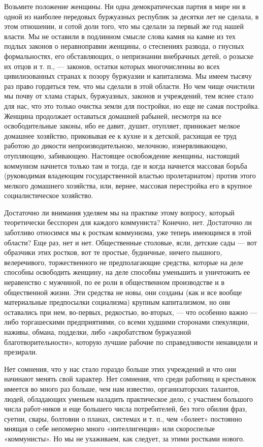 \documentclass[12pt]{article}
\newcommand{\parnum}{(\arabic{parcount})}
\newcounter{parcount}
\newenvironment{parnumbers}{%
  \par%
  \everypar{\noindent \stepcounter{parcount}\marginpar[]{\parnum}}%
}{}
\begin{document}
\begin{parnumbers}
Возьмите положение женщины. Ни одна демократическая партия в мире ни в одной из наиболее передовых буржуазных республик за десятки лет не сделала, в этом отношении, и сотой доли того, что мы сделали за первый же год нашей власти. Мы не оставили в подлинном смысле слова камня на камне из тех подлых законов о неравноправии женщины, о стеснениях развода, о гнусных формальностях, его обставляющих, о непризнании внебрачных детей, о розыске их отцов и т. п., — законов, остатки которых многочисленны во всех цивилизованных странах к позору буржуазии и капитализма. Мы имеем тысячу раз право гордиться тем, что мы сделали в этой области. Но чем чище очистили мы почву от хлама старых, буржуазных, законов и учреждений, тем яснее стало для нас, что это только очистка земли для постройки, но еще не самая постройка. Женщина продолжает оставаться домашней рабыней, несмотря на все освободительные законы, ибо ее давит, душит, отупляет, принижает мелкое домашнее хозяйство, приковывая ее к кухне и к детской, расхищая ее труд работою до дикости непроизводительною, мелочною, изнервливающею, отупляющею, забивающею. Настоящее освобождение женщины, настоящий коммунизм начнется только там и тогда, где и когда начнется массовая борьба (руководимая владеющим государственной властью пролетариатом) против этого мелкого домашнего хозяйства, или, вернее, массовая перестройка его в крупное социалистическое хозяйство.

Достаточно ли внимания уделяем мы на практике этому вопросу, который теоретически бесспорен для каждого коммуниста? Конечно, нет. Достаточно ли заботливо относимся мы к росткам коммунизма, уже теперь имеющимся в этой области? Еще раз, нет и нет. Общественные столовые, ясли, детские сады — вот образчики этих ростков, вот те простые, будничные, ничего пышного, велеречивого, торжественного не предполагающие средства, которые на деле способны освободить женщину, на деле способны уменьшить и уничтожить ее неравенство с мужчиной, по ее роли в общественном производстве и в общественной жизни. Эти средства не новы, они созданы (как и все вообще материальные предпосылки социализма) крупным капитализмом, но они оставались при нем, во-первых, редкостью, во-вторых, — что особенно важно — либо торгашескими предприятиями, со всеми худшими сторонами спекуляции, наживы, обмана, подделки, либо «акробатством буржуазной благотворительности», которую лучшие рабочие по справедливости ненавидели и презирали.

Нет сомнения, что у нас стало гораздо больше этих учреждений и что они начинают менять свой характер. Нет сомнения, что среди работниц и крестьянок имеется во много раз больше, чем нам известно, организаторских талантов, людей, обладающих уменьем наладить практическое дело, с участием большого числа работ-ников и еще большего числа потребителей, без того обилия фраз, суетни, свары, болтовни о планах, системах и т. п., чем «болеет» постоянно мнящая о себе непомерно много «интеллигенция» или скороспелые «коммунисты». Но мы не ухаживаем, как следует, за этими ростками нового.


\end{parnumbers}
\end{document}
